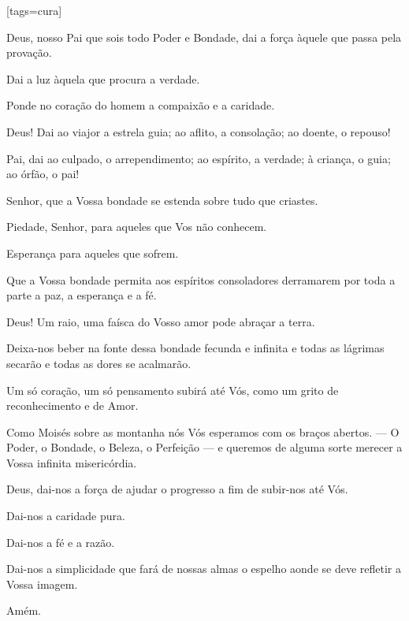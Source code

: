 \sclearpage
{}[tags={cura}]
  \begin{passage}[PT]{}
    Deus, nosso Pai que sois todo Poder e Bondade, dai
    a força àquele que passa pela provação.
    \par
    Dai a luz àquela que procura a verdade.
    \par
    Ponde no coração do homem a compaixão e a caridade.
    \par
    Deus! Dai ao viajor a estrela guia; ao aflito,
    a consolação; ao doente, o repouso!
    \par
    Pai, dai ao culpado, o arrependimento; ao espírito,
    a verdade; à criança, o guia; ao órfão, o pai!
    \par
    Senhor, que a Vossa bondade se estenda sobre tudo
    que criastes.
    \par
    Piedade, Senhor, para aqueles que Vos não conhecem.
    \par
    Esperança para aqueles que sofrem.
    \par
    Que a Vossa bondade permita aos espíritos
    consoladores derramarem por toda a parte a paz, a
    esperança e a fé.
    \par
    Deus! Um raio, uma faísca do Vosso amor pode abraçar
    a terra.
    \par
    Deixa-nos beber na fonte dessa bondade fecunda
    e infinita e todas as lágrimas secarão e todas as
    dores se acalmarão.
    \par
    Um só coração, um só pensamento subirá até Vós,
    como um grito de reconhecimento e de Amor.
    \par
    Como Moisés sobre as montanha nós Vós esperamos
    com os braços abertos. ---
    O Poder, o Bondade, o Beleza, o Perfeição ---
    e queremos de alguma sorte merecer a Vossa infinita
    misericórdia.
    \par
    Deus, dai-nos a força de ajudar o progresso a fim
    de subir-nos até Vós.
    \par
    Dai-nos a caridade pura.
    \par
    Dai-nos a fé e a razão.
    \par
    Dai-nos a simplicidade que fará de nossas almas o
    espelho aonde se deve refletir a Vossa imagem.
    \par
    Amém.
  \end{passage}
